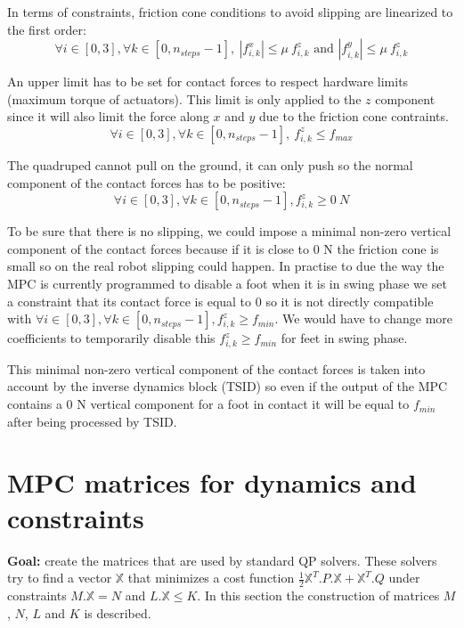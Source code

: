 \documentclass[a4paper,11pt]{article}
\begin{document}
In terms of constraints, friction cone conditions to avoid slipping are linearized to the first order:
\begin{equation}
\forall i \in [0, 3], \forall k \in [0, n_{steps}-1],~|f_{i,k}^x| \leq \mu ~ f_{i,k}^z \text{ and } |f_{i,k}^y| \leq \mu ~ f_{i,k}^z
\end{equation}
 
An upper limit has to be set for contact forces to respect hardware limits (maximum torque of actuators). This limit is only applied to the $z$ component since it will also limit the force along $x$ and $y$ due to the friction cone contraints.
\begin{equation}
\forall i \in [0, 3], \forall k \in [0, n_{steps}-1],~f_{i,k}^z \leq f_{max}
\end{equation}

The quadruped cannot pull on the ground, it can only push so the normal component of the contact forces has to be positive:
\begin{equation}
\forall i \in [0, 3], \forall k \in [0, n_{steps}-1], f_{i,k}^z \geq 0~N
\end{equation}
 
To be sure that there is no slipping, we could impose a minimal non-zero vertical component of the contact forces because if it is close to 0 N the friction cone is small so on the real robot slipping could happen. In practise to due the way the MPC is currently programmed to disable a foot when it is in swing phase we set a constraint that its contact force is equal to 0 so it is not directly compatible with $\forall i \in [0, 3], \forall k \in [0, n_{steps}-1], f_{i,k}^z \geq f_{min}$. We would have to change more coefficients to temporarily disable this $f_{i,k}^z \geq f_{min}$ for feet in swing phase.

This minimal non-zero vertical component of the contact forces is taken into account by the inverse dynamics block (TSID) so even if the output of the MPC contains a 0 N vertical component for a foot in contact it will be equal to $f_{min}$ after being processed by TSID. 


\newpage
\section{MPC matrices for dynamics and constraints}

\textbf{Goal:} create the matrices that are used by standard QP solvers. These solvers try to find a vector $\mathbb{X}$ that minimizes a cost function $\frac{1}{2}\mathbb{X}^T.P.\mathbb{X} + \mathbb{X}^T.Q$ under constraints $M.\mathbb{X} = N$ and $L.\mathbb{X} \leq K$. In this section the construction of matrices $M$, $N$, $L$ and $K$ is described.
\end{document}
